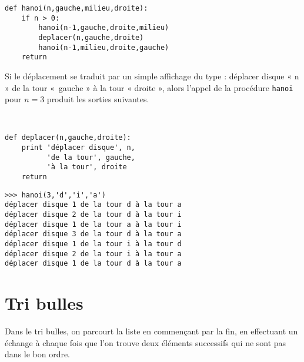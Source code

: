\begin{lstlisting}[caption={\bf Tours de Hanoï},label=cl:hanoi]
def hanoi(n,gauche,milieu,droite):
    if n > 0:
        hanoi(n-1,gauche,droite,milieu)
        deplacer(n,gauche,droite)
        hanoi(n-1,milieu,droite,gauche)
    return
\end{lstlisting}
Si le déplacement se traduit par un simple affichage du type :
déplacer disque « n » de la tour «~gauche » à la tour « droite »,
alors l'appel de la procédure {\tt hanoi} pour $n = 3$ produit
les sorties suivantes.

\mbox{}\ \ \begin{py}{5cm}
\begin{verbatim}
def deplacer(n,gauche,droite):
    print 'déplacer disque', n,
          'de la tour', gauche, 
          'à la tour', droite
    return
\end{verbatim}
\end{py}
\hfill
\begin{py}{8cm}
\begin{verbatim}
>>> hanoi(3,'d','i','a')
déplacer disque 1 de la tour d à la tour a
déplacer disque 2 de la tour d à la tour i
déplacer disque 1 de la tour a à la tour i
déplacer disque 3 de la tour d à la tour a
déplacer disque 1 de la tour i à la tour d
déplacer disque 2 de la tour i à la tour a
déplacer disque 1 de la tour d à la tour a
\end{verbatim}
\end{py}
\vspace*{2mm}

\section*{Tri bulles}

Dans le tri bulles, on parcourt la liste en commençant par la fin, en effectuant un échange à
chaque fois que l'on trouve deux éléments successifs qui ne sont pas dans le bon ordre.

